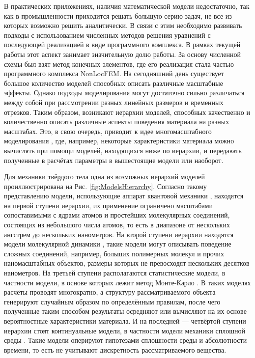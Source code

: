 \ifsynopsis
В практических приложениях, наличия математической модели недостаточно, так как в промышленности приходится решать большую серию задач, не все из которых возможно решить аналитически. В связи с этим необходимо развивать подходы с использованием численных методов решения уравнений с последующей реализацией в виде программного комплекса. В рамках текущей работы этот аспект занимает значительную долю работы. За основу численной схемы был взят метод конечных элементов, где его реализация стала частью программного комплекса NonLocFEM.
\nocite{AMCSM2019}
		\nocite{ZAMM}
		\nocite{NonlocalSaintVenant}
		\nocite{NonlocalRadiation}
\else
На сегодняшний день существует большое количество моделей способных описать различные масштабные эффекты. Однако подходы моделирования могут достаточно сильно различаться между собой при рассмотрении разных линейных размеров и временных отрезков. Таким образом, возникают иерархии моделей, способных качественно и количественно описать различные аспекты поведения материала на разных масштабах. Это, в свою очередь, приводит к идее многомасштабного моделирования \cite{Multiscale1}, где, например, некоторые характеристики материала можно вычислять при помощи моделей, находящихся ниже по иерархии, и передавать полученные в расчётах параметры в вышестоящие модели или наоборот.
\fi

\ifsynopsis
\else
Для механики твёрдого тела одна из возможных иерархий моделей проиллюстрирована на Рис. \ref{fig:ModelsHierarchy}. Согласно такому представлению модели, использующие аппарат квантовой механики \cite{QuantumModelling1, QuantumModelling2}, находятся на первой ступени иерархии, их применение ограничено масштабами сопоставимыми с ядрами атомов и простейших молекулярных соединений, состоящих из небольшого числа атомов, то есть в диапазоне от нескольких ангстрем до нескольких нанометров. На второй ступени иерархии находятся модели молекулярной динамики \cite{MD1, MD2, MD3, MD4}, такие модели могут описывать поведение сложных соединений, например, больших полимерных молекул и прочих наномасштабных объектов, размеры которых не превосходят нескольких десятков нанометров. На третьей ступени располагаются статистические модели, в частности модели, в основе которых лежит метод Монте-Карло \cite{MonteCarlo1, MonteCarlo2}. В таких моделях расчёты проводят многократно, а структуру рассматриваемого объекта генерируют случайным образом по определённым правилам, после чего полученные таким способом результаты осредняют или вычисляют на их основе вероятностные характеристики материала. И на последней --- четвёртой ступени иерархии стоят континуальные модели, в частности модели механики сплошной среды \cite{MSS}. Такие модели оперируют гипотезами сплошности среды и абсолютности времени, то есть не учитывают дискретность рассматриваемого вещества.
\fi

